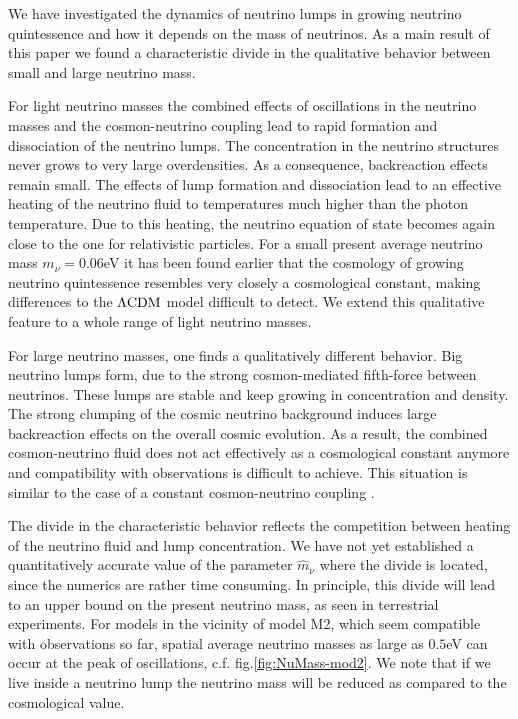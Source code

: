 We have investigated the dynamics of neutrino lumps in growing neutrino
quintessence and how it depends on the mass of neutrinos. As a main
result of this paper we found a characteristic divide in the qualitative
behavior between small and large neutrino mass.

For light neutrino masses the combined effects of oscillations in
the neutrino masses and the cosmon-neutrino coupling lead to rapid
formation and dissociation of the neutrino lumps. The concentration
in the neutrino structures never grows to very large overdensities.
As a consequence, backreaction effects remain small. The effects of
lump formation and dissociation lead to an effective heating of the
neutrino fluid to temperatures much higher than the photon temperature.
Due to this heating, the neutrino equation of state becomes again
close to the one for relativistic particles. For a small present average
neutrino mass $m_{\nu}=0.06$eV it has been found earlier \cite{pettorino_neutrino_2010}
that the cosmology of growing neutrino quintessence resembles very
closely a cosmological constant, making differences to the $\Lambda\mathrm{CDM}$
model difficult to detect. We extend this qualitative feature to a
whole range of light neutrino masses.

For large neutrino masses, one finds a qualitatively different behavior.
Big neutrino lumps form, due to the strong cosmon-mediated fifth-force
between neutrinos. These lumps are stable and keep growing in concentration
and density. The strong clumping of the cosmic neutrino background
induces large backreaction effects on the overall cosmic evolution.
As a result, the combined cosmon-neutrino fluid does not act effectively
as a cosmological constant anymore and compatibility with observations
is difficult to achieve. This situation is similar to the case of
a constant cosmon-neutrino coupling \cite{fuhrer_backreaction_2015}.

The divide in the characteristic behavior reflects the competition
between heating of the neutrino fluid and lump concentration. We have
not yet established a quantitatively accurate value of the parameter
$\hat{m}_{\nu}$ where the divide is located, since the numerics are
rather time consuming. In principle, this divide will lead to an upper
bound on the present neutrino mass, as seen in terrestrial experiments.
For models in the vicinity of model M2, which seem compatible with
observations so far, spatial average neutrino masses as large as $0.5$eV
can occur at the peak of oscillations, c.f. fig.\ref{fig:NuMass-mod2}.
We note that if we live inside a neutrino lump the neutrino mass will
be reduced as compared to the cosmological value.

